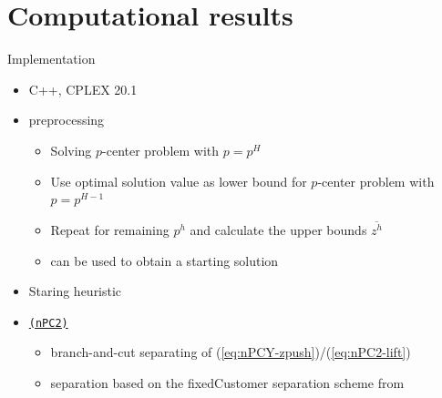 \documentclass[utf8,aspectratio=1610,ngerman,english]{beamer}
\renewcommand{\emph}[1]{\textcolor{jkuGreen}{#1}}
\newcommand{\nPCE}{\hyperref[eq:nPCE]{\texttt{(nPC3)}}\xspace}
\newcommand{\nPCY}{\hyperref[eq:nPCY]{\texttt{(nPC2)}}\xspace}
\begin{document}
\section{Computational results}
\begin{frame}{Implementation}
    \begin{itemize}
        \item \emph{C++, CPLEX} 20.1 \pause
        \item \emph{preprocessing}
              \begin{itemize}
                  \item Solving \emph{$p$-center problem} with $p = p^H$
                  \item Use optimal solution value as lower bound for \emph{$p$-center problem} with $p = p^{H-1}$
                  \item Repeat for remaining $p^h$ and calculate the upper bounds $\overline{z^h}$
                  \item can be used to obtain a starting solution
              \end{itemize} \pause
        \item Staring heuristic
        \item \nPCY
              \begin{itemize}
                  \item \emph{branch-and-cut} separating of (\ref{eq:nPCY-zpush})/(\ref{eq:nPC2-lift})
                  \item separation based on the \emph{fixedCustomer} separation scheme from \citet{GAAR2022}
              \end{itemize} \pause
    \end{itemize}
\end{frame}
\end{document}
